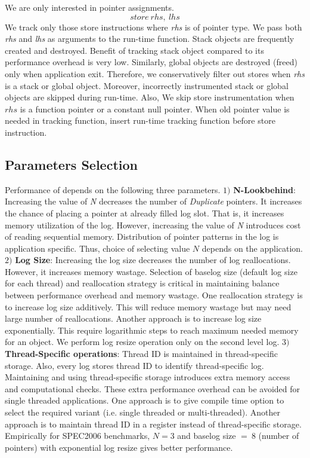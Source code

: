 We are only interested in pointer assignments.
$$ store\ rhs,\ lhs $$
We track only those store instructions where \textit{rhs} is of pointer type. We pass both \textit{rhs} and \textit{lhs} as arguments to the run-time function. Stack objects are frequently created and destroyed. Benefit of tracking stack object compared to its performance overhead is very low. Similarly, global objects are destroyed (freed) only when application exit. Therefore, we conservatively filter out stores when \textit{rhs} is a stack or global object. Moreover, incorrectly instrumented stack or global objects are skipped during run-time. Also, We skip store instrumentation when $rhs$ is a function pointer or a constant null pointer. When old pointer value is needed in tracking function, insert run-time tracking function before store instruction.  \\

\subsection{Parameters Selection} 
Performance of \projectname{} depends on the following three parameters. $1)$ \textbf{N-Lookbehind}: Increasing the value of \emph{N} decreases the number of \textit{Duplicate} pointers. It increases the chance of placing a pointer at already filled log slot. That is, it increases memory utilization of the log. However, increasing the value of \emph{N} introduces cost of reading sequential memory. Distribution of pointer patterns in the log is application specific. Thus, choice of selecting value $N$ depends on the application. $2)$ \textbf{Log Size}: Increasing the log size decreases the number of log reallocations. However, it increases memory wastage. Selection of baselog size (default log size for each thread) and reallocation strategy is critical in maintaining balance between performance overhead and memory wastage. One reallocation strategy is to increase log size additively. This will reduce memory wastage but may need large number of reallocations. Another approach is to increase log size exponentially. This require logarithmic steps to reach maximum needed memory for an object. We perform log resize operation only on the second level log. $3)$ \textbf{Thread-Specific operations}: Thread ID is maintained in thread-specific storage. Also, every log stores thread ID to identify thread-specific log. Maintaining and using thread-specific storage introduces extra memory access and computational checks. These extra performance overhead can be avoided for single threaded applications. One approach is to give compile time option to select the required variant (i.e. single threaded or multi-threaded). Another approach is to maintain thread ID in a register instead of thread-specific storage. Empirically for SPEC2006 benchmarks, $N = 3$ and baselog size $=\ 8$ (number of pointers) with exponential log resize gives better performance.






